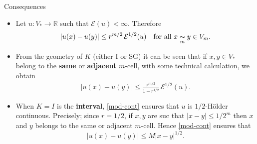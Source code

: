 \begin{frame}{Consequences}
\begin{itemize}
\item Let $u:V_*\rightarrow \mathbb{R}$ such that $\mathcal{E}(u)<\infty$. Therefore
\begin{align}
\lvert u(x)-u(y)\rvert\leq r^{m/2}\,\mathcal{E}^{1/2}(u)\quad \text{for all } x\underset{m}{\thicksim} y\in V_m.
\end{align}

\vspace{0.25cm}
\item From the geometry of $K$ (either I or SG) it can be seen that if $x,y\in V_*$ belong to the \textbf{same} or \textbf{adjacent} $m$-cell, with some technical calculation, we obtain 
\begin{align}\label{mod-cont}
\lvert u(x)-u(y)\rvert  \leq \frac{r^{m/2}}{1-r^{1/2}}\, \mathcal{E}^{1/2}(u).
\end{align}

\item When $K=I$ is the \textbf{interval}, \eqref{mod-cont} ensures that $u$ is $1/2$-Hölder continuous. Precisely; since $r=1/2$, if $x,y$ are suc that $|x-y|\leq 1/2^{m}$ then $x$ and $y$ belongs to the same or adjacent $m$-cell. Hence \eqref{mod-cont} ensures that
\begin{equation}
    |u(x)-u(y)|\leq M |x-y|^{1/2}.
\end{equation}
\end{itemize} 
\end{frame}

